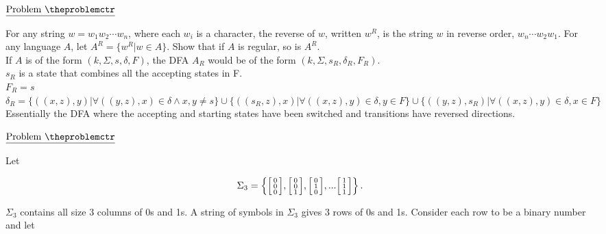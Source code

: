\documentclass[11pt]{article}
\def\pp{\par\noindent}
\newenvironment{bsmallmatrix}
  {\left[\begin{smallmatrix}}
  {\end{smallmatrix}\right]}
\begin{document}
\addtocounter{problemctr}{1}
\bigskip
\noindent
$\underline{\rm Problem\ \theproblemctr}$ \pp

\noindent
For any string $w = w_1 w_2 \cdots w_n$, where each $w_i$ is a character, the reverse of $w$, written $w^R$, is the string $w$ in reverse order, $w_n \cdots w_2 w_1$. For any language $A$, let $A^R = \{w^R | w \in A\}$. Show that if $A$ is regular, so is $A^R$.\\

If $A$ is of the form $(k, \Sigma, s, \delta, F)$, the DFA $A_R$ would be of the form $(k, \Sigma, s_R, \delta_R, F_R)$.\\

$s_R$ is a state that combines all the accepting states in F.\\
$F_R=s$\\
$\delta_R=\{((x,z),y)|\forall((y,z),x)\in\delta \land x,y\neq s\}\cup \{((s_R, z), x)|\forall((x,z),y)\in \delta, y\in F\}\cup \{((y, z), s_R)|\forall((x,z),y)\in \delta, x\in F\}$\\

Essentially the DFA where the accepting and starting states have been switched and transitions have reversed directions.\\

\addtocounter{problemctr}{1}
\bigskip
\noindent
$\underline{\rm Problem\ \theproblemctr}$ \pp

\noindent
Let

\begin{equation*}
  \Sigma_3 =
  \left \{
  \begin{bsmallmatrix}0 \\ 0 \\ 0\end{bsmallmatrix},
  \begin{bsmallmatrix}0 \\ 0 \\ 1\end{bsmallmatrix},
  \begin{bsmallmatrix}0 \\ 1 \\ 0\end{bsmallmatrix},
  ...
  \begin{bsmallmatrix}1 \\ 1 \\ 1\end{bsmallmatrix}
  \right \}.
\end{equation*}

$\Sigma_3$ contains all size 3 columns of 0s and 1s. A string of symbols in
$\Sigma_3$ gives 3 rows of 0s and 1s. Consider each row to be a binary number
and let
\end{document}
